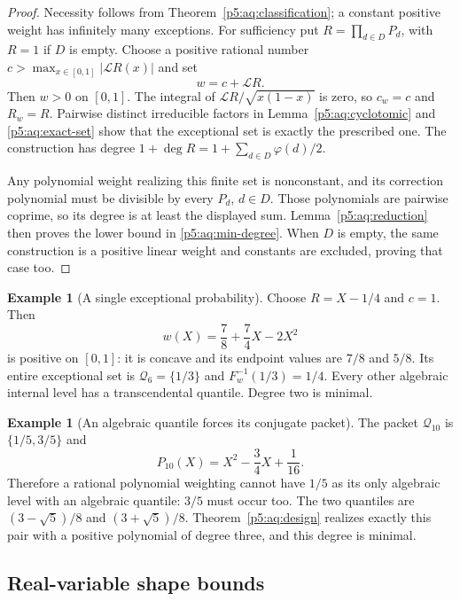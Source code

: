 \documentclass[11pt,a4paper]{article}
\theoremstyle{definition}
\newtheorem{example}[theorem]{Example}
\theoremstyle{remark}
\numberwithin{equation}{section}
\begin{document}
\begin{proof}
Necessity follows from Theorem~\ref{p5:aq:classification};
a constant positive weight has infinitely many exceptions.
For sufficiency put
$R=\prod_{d\in D}P_d$, with $R=1$ if $D$ is empty.
Choose a positive rational number
$c>\max_{x\in[0,1]}|\mathcal LR(x)|$ and set
\[
 w=c+\mathcal LR.
\]
Then $w>0$ on $[0,1]$. The integral of
$\mathcal LR/\sqrt{x(1-x)}$ is zero, so $c_w=c$ and
$R_w=R$. Pairwise distinct irreducible factors in
Lemma~\ref{p5:aq:cyclotomic} and \eqref{p5:aq:exact-set} show that
the exceptional set is exactly the prescribed one.
The construction has degree
$1+\deg R=1+\sum_{d\in D}\varphi(d)/2$.

Any polynomial weight realizing this finite set is nonconstant,
and its correction polynomial must be divisible by every $P_d$,
$d\in D$. Those polynomials are pairwise coprime, so its degree
is at least the displayed sum. Lemma~\ref{p5:aq:reduction} then
proves the lower bound in \eqref{p5:aq:min-degree}.
When $D$ is empty, the same construction is a positive
linear weight and constants are excluded, proving that case too.
\end{proof}

\begin{example}[A single exceptional probability]\label{p5:aq:example-third}
Choose $R=X-1/4$ and $c=1$. Then
\[
 w(X)=\frac78+\frac74X-2X^2
\]
is positive on $[0,1]$: it is concave and its endpoint values
are $7/8$ and $5/8$. Its entire exceptional set is
$\mathcal Q_6=\{1/3\}$ and
$F_w^{-1}(1/3)=1/4$. Every other algebraic internal level
has a transcendental quantile. Degree two is minimal.
\end{example}

\begin{example}[An algebraic quantile forces its conjugate packet]
The packet $\mathcal Q_{10}$ is $\{1/5,3/5\}$ and
\[
 P_{10}(X)=X^2-\frac34X+\frac1{16}.
\]
Therefore a rational polynomial weighting cannot have $1/5$
as its only algebraic level with an algebraic quantile: $3/5$
must occur too. The two quantiles are
$(3-\sqrt5)/8$ and $(3+\sqrt5)/8$. Theorem~\ref{p5:aq:design}
realizes exactly this pair with a positive polynomial of
degree three, and this degree is minimal.
\end{example}

\subsection{Real-variable shape bounds}
\end{document}
